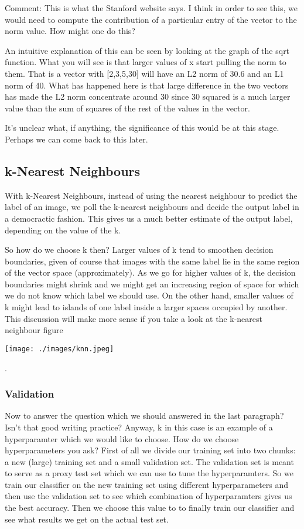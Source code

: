 \documentclass[11pt]{article}
\begin{document}
Comment: This is what the Stanford website says. I think in order to see this, we would need to compute the contribution 
of a particular entry of the vector to the norm value. How might one do this? 

An intuitive explanation of this can be seen by looking at the graph of the sqrt function. What you will see is that larger
values of x start pulling the norm to them. That is a vector with [2,3,5,30] will have an L2 norm of 30.6 and an L1 norm
of 40. What has happened here is that large difference in the two vectors has made the L2 norm concentrate around 30 since 
30 squared is a much larger value than the sum of squares of the rest of the values in the vector.

It's unclear what, if anything, the significance of this would be at this stage. Perhaps we can come back to this later.


\subsection{k-Nearest Neighbours}
\label{sec:org1b6672d}

With k-Nearest Neighbours, instead of using the nearest neighbour to predict the label of an image, we poll the k-nearest neighbours
and decide the output label in a democractic fashion. This gives us a much better estimate of the output label, depending on the value
of the k. 

So how do we choose k then? Larger values of k tend to smoothen decision boundaries, given of course that images with the same label 
lie in the same region of the vector space (approximately). As we go for higher values of k, the decision boundaries might shrink
and we might get an increasing region of space for which we do not know which label we should use. On the other hand, smaller values of 
k might lead to islands of one label inside a larger spaces occupied by another. This discussion will make more sense if you take a look
at the k-nearest neighbour figure \begin{center}
\texttt{[image: ./images/knn.jpeg]}
\end{center}. 

\subsubsection{Validation}
\label{sec:org0489779}
Now to answer the question which we should answered in the last paragraph? Isn't that good writing practice? Anyway, k in this case
is an example of a hyperparamter which we would like to choose. How do we choose hyperparameters you ask? First of all we divide our 
training set into two chunks: a new (large) training set and a small validation set. The validation set is meant to serve as a proxy
test set which we can use to tune the hyperparamters. So we train our classifier on the new training set using different hyperparameters
and then use the validation set to see which combination of hyperparamters gives us the best accuracy. Then we choose this value to to finally
train our classifier and see what results we get on the actual test set. 
\end{document}
